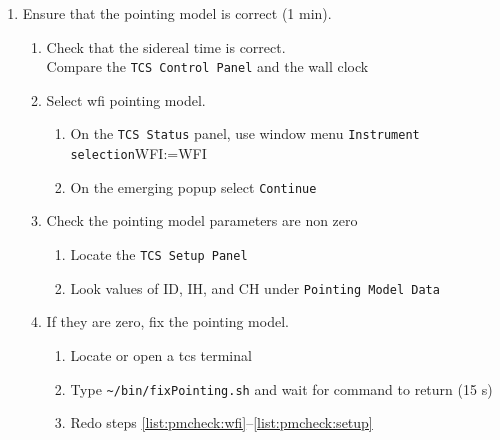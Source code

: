 \documentclass[11pt,fleqn]{book}
\makeatletter
\def\menu#1#2{\texttt{#1}\ifx{}#2\else\@for\@x:=#2\do{$\rightarrow$\texttt{\@x}}\fi}
\def\wmenu#1#2{window menu \menu{#1}{#2}}
\def\procref#1{Procedure~\ref{proc:#1}, p.~\pageref{proc:#1}}
\def\home{\textasciitilde{}}
\makeatother
\begin{document}
\begin{enumerate}
\begin{enumerate}
\begin{enumerate}
                \item Select \wmenu{View}{Autoscale}
                \item If steps \ref{list:ccdstat}--\ref{list:skycatro} do not work, see \procref{fixwfiag}.
                \item On the \texttt{skycat} window, use \wmenu{TCS}{Pick Reference Star...}
                \item On emerging window (title \texttt{Pick Reference Star}), click \texttt{Cancel Operation}
          \end{enumerate}
          \item Ensure that the pointing model is correct (1 min).
          \begin{enumerate}
            \item Check that the sidereal time is correct.\\
                  Compare the \texttt{TCS Control Panel} and the wall clock
            \item\label{list:pmcheck:wfi} Select \gls{wfi} pointing model.
               \begin{enumerate}
                  \item On the \texttt{TCS Status} panel, use \wmenu{Instrument selection}{WFI}
                  \item On the emerging popup select \texttt{Continue}
               \end{enumerate}
            \item\label{list:pmcheck:setup} Check the pointing model parameters are non zero
               \begin{enumerate}
                  \item Locate the \texttt{TCS Setup Panel}
                  \item Look values of ID, IH, and CH under \texttt{Pointing Model Data}
               \end{enumerate} 
            \item If they are zero, fix the pointing model.
                \begin{enumerate}
                  \item Locate or open a tcs terminal 
                  \item Type \texttt{\home/bin/fixPointing.sh} and wait for command to return (15 s)
                  \item Redo steps \ref{list:pmcheck:wfi}--\ref{list:pmcheck:setup}
                \end{enumerate}

\end{enumerate}
\end{enumerate}
\end{enumerate}
\end{document}
